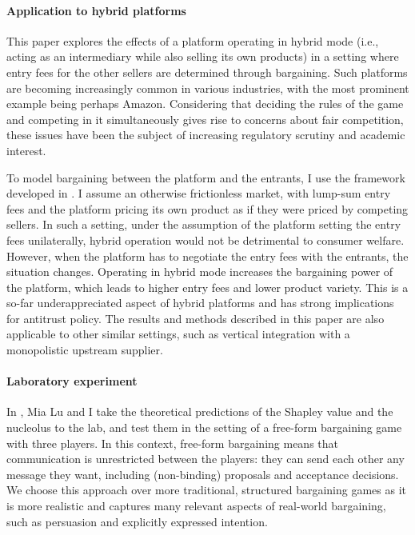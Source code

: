 \paragraph{Application to hybrid platforms}
This paper explores the effects of a platform operating in hybrid mode (i.e., acting as an intermediary while also selling its own products) in a setting where entry fees for the other sellers are determined through bargaining.
Such platforms are becoming increasingly common in various industries, with the most prominent example being perhaps Amazon.
Considering that deciding the rules of the game and competing in it simultaneously gives rise to concerns about fair competition, these issues have been the subject of increasing regulatory scrutiny and academic interest.

To model bargaining between the platform and the entrants, I use the framework developed in .
I assume an otherwise frictionless market, with lump-sum entry fees and the platform pricing its own product as if they were priced by competing sellers.
In such a setting, under the assumption of the platform setting the entry fees unilaterally, hybrid operation would not be detrimental to consumer welfare.
However, when the platform has to negotiate the entry fees with the entrants, the situation changes.
Operating in hybrid mode increases the bargaining power of the platform, which leads to higher entry fees and lower product variety.
This is a so-far underappreciated aspect of hybrid platforms and has strong implications for antitrust policy.
The results and methods described in this paper are also applicable to other similar settings, such as vertical integration with a monopolistic upstream supplier.

\paragraph{Laboratory experiment}
In , Mia Lu and I take the theoretical predictions of the Shapley value and the nucleolus to the lab, and test them in the setting of a free-form bargaining game with three players.
In this context, free-form bargaining means that communication is unrestricted between the players: they can send each other any message they want, including (non-binding) proposals and acceptance decisions.
We choose this approach over more traditional, structured bargaining games as it is more realistic and captures many relevant aspects of real-world bargaining, such as persuasion and explicitly expressed intention.

